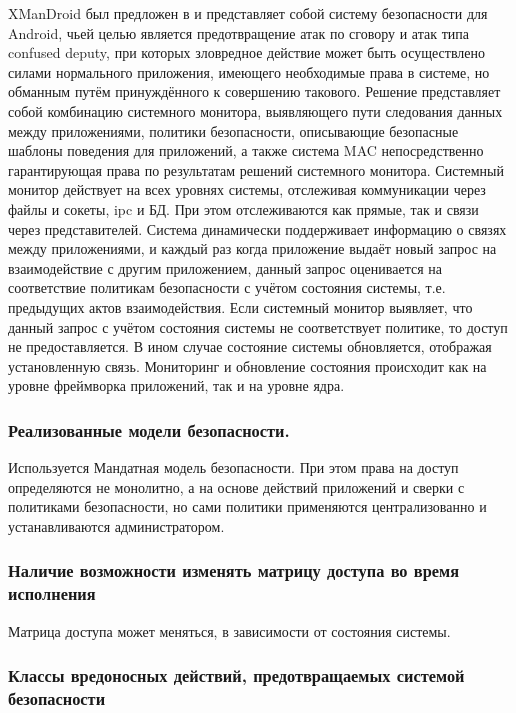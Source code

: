 XManDroid был предложен в \cite{xmandroid} и представляет собой систему
безопасности для Android, чьей целью является предотвращение атак по
сговору и атак типа confused deputy, при которых зловредное действие
может быть осуществлено силами нормального приложения, имеющего
необходимые права в системе, но обманным путём принуждённого к
совершению такового. Решение представляет собой комбинацию системного
монитора, выявляющего пути следования данных между приложениями,
политики безопасности, описывающие безопасные шаблоны поведения для
приложений, а также система MAC непосредственно гарантирующая права по
результатам решений системного монитора.  Системный монитор действует на
всех уровнях системы, отслеживая коммуникации через файлы и сокеты, ipc
и БД. При этом отслеживаются как прямые, так и связи через
представителей. Система динамически поддерживает информацию о связях
между приложениями, и каждый раз когда приложение выдаёт новый запрос на
взаимодействие с другим приложением, данный запрос оценивается на
соответствие политикам безопасности с учётом состояния системы, т.е.
предыдущих актов взаимодействия. Если системный монитор выявляет, что
данный запрос с учётом состояния системы не соответствует политике, то
доступ не предоставляется. В ином случае состояние системы обновляется,
отображая установленную связь. Мониторинг и обновление состояния
происходит как на уровне фреймворка приложений, так и на уровне ядра.

\subsubsection {Реализованные модели безопасности.} 

Используется Мандатная модель безопасности. При этом права на доступ
определяются не монолитно, а на основе действий приложений и сверки
с политиками безопасности, но сами политики применяются централизованно
и устанавливаются администратором.

\subsubsection{Наличие возможности изменять матрицу доступа 
	во время исполнения} 

Матрица доступа может меняться, в зависимости от состояния системы.

\subsubsection{Классы вредоносных действий, предотвращаемых 
	системой безопасности} 


